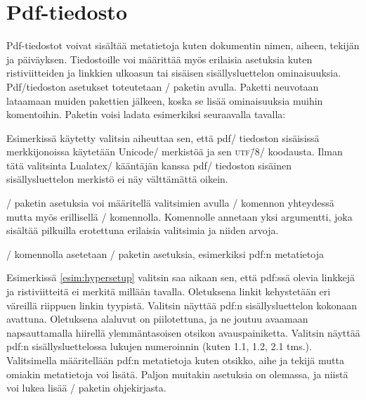 \section{Pdf-tiedosto}
\label{luku:pdf_asetukset}

Pdf-tiedostot voivat sisältää metatietoja kuten dokumentin nimen,
aiheen, tekijän ja päiväyksen. Tiedostoille voi määrittää myös erilaisia
asetuksia kuten ristiviitteiden ja linkkien ulkoasun tai sisäisen
sisällysluettelon ominaisuuksia. Pdf\-/tiedoston asetukset toteutetaan
\-/ paketin avulla. Paketti
neuvotaan lataamaan muiden pakettien jälkeen, koska se lisää
ominaisuuksia muihin komentoihin. Paketin voisi ladata esimerkiksi
seuraavalla tavalla:

\begin{koodilohkosis}
\usepackage[unicode]{hyperref}
\end{koodilohkosis}

Esimerkissä käytetty valitsin  aiheuttaa sen, että pdf\-/
tiedoston sisäisissä merkkijonoissa käytetään Unicode\-/ merkistöä ja
sen \textsc{utf\=/8}\-/ koodausta. Ilman tätä valitsinta Lualatex\-/
kääntäjän kanssa pdf\-/ tiedoston sisäinen sisällysluettelon merkistö ei
näy välttämättä oikein.

\-/ paketin asetuksia voi määritellä valitsimien
avulla \-/ komennon yhteydessä mutta myös
erillisellä \-/ komennolla. Komennolle annetaan
yksi argumentti, joka sisältää pilkuilla erotettuna erilaisia valitsimia
ja niiden arvoja.

\begin{esimerkki*}
\begin{koodilohko}
\end{koodilohko}
  \caption{\-/ komennolla asetetaan
    \-/ paketin asetuksia, esimerkiksi pdf:n
    metatietoja}
  \label{esim:hypersetup}
\end{esimerkki*}

Esimerkissä \ref{esim:hypersetup} valitsin  saa aikaan
sen, että pdf:ssä olevia linkkejä ja ristiviitteitä ei merkitä millään
tavalla. Oletuksena linkit kehystetään eri väreillä riippuen linkin
tyypistä. Valitsin  näyttää pdf:n sisällysluettelon
kokonaan avattuna. Oletuksena alaluvut on piilotettuna, ja ne joutuu
avaamaan napsauttamalla hiirellä ylemmäntasoisen otsikon
avauspainiketta. Valitsin  näyttää pdf:n
sisällysluettelossa lukujen numeroinnin (kuten 1.1, 1.2, 2.1 tms.).
Valitsimella  määritellään pdf:n metatietoja kuten
otsikko, aihe ja tekijä mutta omiakin metatietoja voi lisätä. Paljon
muitakin asetuksia on olemassa, ja niistä voi lukea lisää
\-/ paketin ohjekirjasta.

